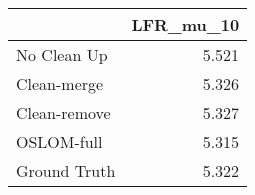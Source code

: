 \begin{tabular}{lr}
\toprule
{} & LFR_mu_10 \\
\midrule
No Clean Up  &     5.521 \\
Clean-merge  &     5.326 \\
Clean-remove &     5.327 \\
OSLOM-full   &     5.315 \\
Ground Truth &     5.322 \\
\bottomrule
\end{tabular}

